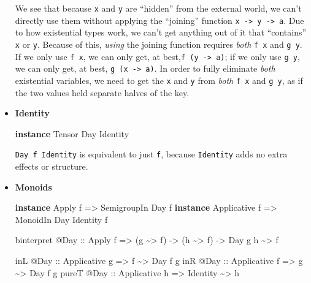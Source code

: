 \documentclass[]{article}
\newenvironment{Shaded}{}{}
\newcommand{\DataTypeTok}[1]{\textcolor[rgb]{0.56,0.13,0.00}{#1}}
\newcommand{\KeywordTok}[1]{\textcolor[rgb]{0.00,0.44,0.13}{\textbf{#1}}}
\newcommand{\NormalTok}[1]{#1}
\newcommand{\OperatorTok}[1]{\textcolor[rgb]{0.40,0.40,0.40}{#1}}
\newcommand{\OtherTok}[1]{\textcolor[rgb]{0.00,0.44,0.13}{#1}}
\begin{document}
\begin{itemize}
  We see that because \texttt{x} and \texttt{y} are ``hidden'' from the external
  world, we can't directly use them without applying the ``joining'' function
  \texttt{x\ -\textgreater{}\ y\ -\textgreater{}\ a}. Due to how existential
  types work, we can't get anything out of it that ``contains'' \texttt{x} or
  \texttt{y}. Because of this, \emph{using} the joining function requires
  \emph{both} \texttt{f\ x} and \texttt{g\ y}. If we only use \texttt{f\ x}, we
  can only get, at best,\texttt{f\ (y\ -\textgreater{}\ a)}; if we only use
  \texttt{g\ y}, we can only get, at best, \texttt{g\ (x\ -\textgreater{}\ a)}.
  In order to fully eliminate \emph{both} existential variables, we need to get
  the \texttt{x} and \texttt{y} from \emph{both} \texttt{f\ x} and
  \texttt{g\ y}, as if the two values held separate halves of the key.
\item
  \textbf{Identity}

\begin{Shaded}
\begin{Highlighting}[]
\KeywordTok{instance} \DataTypeTok{Tensor} \DataTypeTok{Day} \DataTypeTok{Identity}
\end{Highlighting}
\end{Shaded}

  \texttt{Day\ f\ Identity} is equivalent to just \texttt{f}, because
  \texttt{Identity} adds no extra effects or structure.
\item
  \textbf{Monoids}

\begin{Shaded}
\begin{Highlighting}[]
\KeywordTok{instance} \DataTypeTok{Apply}\NormalTok{       f }\OtherTok{=\textgreater{}} \DataTypeTok{SemigroupIn} \DataTypeTok{Day}\NormalTok{ f}
\KeywordTok{instance} \DataTypeTok{Applicative}\NormalTok{ f }\OtherTok{=\textgreater{}} \DataTypeTok{MonoidIn}    \DataTypeTok{Day} \DataTypeTok{Identity}\NormalTok{ f}

\NormalTok{binterpret }\OperatorTok{@}\DataTypeTok{Day}
\OtherTok{    ::} \DataTypeTok{Apply}\NormalTok{ f}
    \OtherTok{=\textgreater{}}\NormalTok{ (g }\OperatorTok{\textasciitilde{}\textgreater{}}\NormalTok{ f)}
    \OtherTok{{-}\textgreater{}}\NormalTok{ (h }\OperatorTok{\textasciitilde{}\textgreater{}}\NormalTok{ f)}
    \OtherTok{{-}\textgreater{}} \DataTypeTok{Day}\NormalTok{ g h }\OperatorTok{\textasciitilde{}\textgreater{}}\NormalTok{ f}

\NormalTok{inL   }\OperatorTok{@}\DataTypeTok{Day}\OtherTok{ ::} \DataTypeTok{Applicative}\NormalTok{ g }\OtherTok{=\textgreater{}}\NormalTok{ f        }\OperatorTok{\textasciitilde{}\textgreater{}} \DataTypeTok{Day}\NormalTok{ f g}
\NormalTok{inR   }\OperatorTok{@}\DataTypeTok{Day}\OtherTok{ ::} \DataTypeTok{Applicative}\NormalTok{ f }\OtherTok{=\textgreater{}}\NormalTok{ g        }\OperatorTok{\textasciitilde{}\textgreater{}} \DataTypeTok{Day}\NormalTok{ f g}
\NormalTok{pureT }\OperatorTok{@}\DataTypeTok{Day}\OtherTok{ ::} \DataTypeTok{Applicative}\NormalTok{ h }\OtherTok{=\textgreater{}} \DataTypeTok{Identity} \OperatorTok{\textasciitilde{}\textgreater{}}\NormalTok{ h}
\end{Highlighting}
\end{Shaded}


\end{itemize}
\end{document}
